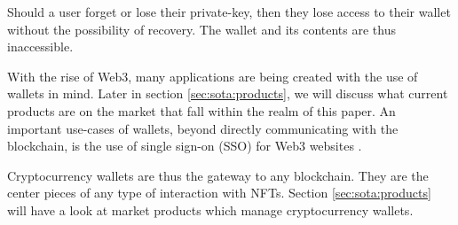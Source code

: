 Should a user forget or lose their private-key, then they lose access to their wallet without the possibility of recovery. The wallet and its contents are thus inaccessible. \cite{wallets2}

With the rise of Web3, many applications are being created with the use of wallets in mind. Later in section \ref{sec:sota:products}, we will discuss what current products are on the market that fall within the realm of this paper. An important use-cases of wallets, beyond directly communicating with the blockchain, is the use of single sign-on (SSO) for Web3 websites \cite{walletConnect}.

Cryptocurrency wallets are thus the gateway to any blockchain. They are the center pieces of any type of interaction with NFTs. Section \ref{sec:sota:products} will have a look at market products which manage cryptocurrency wallets.







